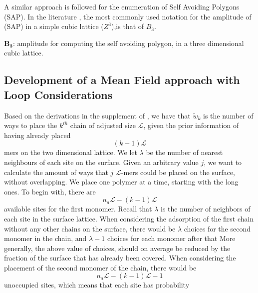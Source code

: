 \documentclass[12pt,letterpaper]{article}
\newcommand{\leng}{\mathcal{L}}
\begin{document}
\begin{tcolorbox}
A similar approach \cite{guttmann2009polygons} is followed for the enumeration of Self Avoiding Polygons (SAP). In the literature \cite{guttmann2009polygons}, the most commonly used notation for the amplitude of (SAP) in a simple cubic lattice ($Z^3$),is that of $B_3$.
\end{tcolorbox}

$\boldsymbol{B_3}$: amplitude for computing the self avoiding polygon, in a three dimensional cubic lattice.

\subsection{Development of a Mean Field approach with Loop Considerations}

Based on the derivations in the supplement of  \cite{koumarianos2021theory}, we have that $\tilde{w}_k$ is the number of ways to place the $k^{th}$ chain of adjusted size $\leng$, given the prior information of having already placed
%
$$
(k-1)\leng
$$
%
mers on the two dimensional lattice. We let $\lambda$ be the number of nearest neighbours of each site on the surface. 
%
%
%
Given an arbitrary value $j$, we want to calculate the amount of ways that $j$ $\leng$-mers could be placed on the surface, without overlapping.
%
We place one polymer at a time, starting with the long ones.
%
%
To begin with, there are
$$
n_a\leng-(k-1)\leng
$$
available sites for the first monomer. 
%
Recall that  $\lambda$ is the number of neighbors of each site in the surface lattice.
%
When considering the adsorption of the first chain without any other chains on the surface, there would be $\lambda$ choices for the second monomer in the chain,
and $\lambda-1$ choices for each monomer after that 
%
%
More generally, the above value of choices, should on average be reduced by the fraction of the surface that has already been covered.
%
When considering the placement of the second monomer of the chain, there would be
$$
n_a\leng-(k-1)\leng-1
$$
unoccupied sites, which means that each site has probability 
\end{document}
